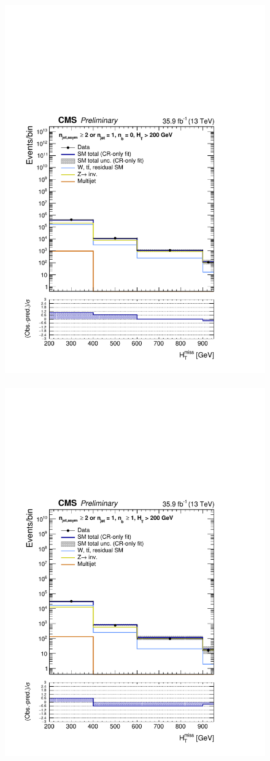 \begin{figure}[h!]
  \centering
  \caption{}
  \includegraphics[width=0.8\linewidth]{figures/results/36invfb/aggregated/postFitShapeCR/mhtShape_eq0b_ge1j2a_200_Inf_crfit.pdf} ~
  \includegraphics[width=0.8\linewidth]{figures/results/36invfb/aggregated/postFitShapeCR/mhtShape_ge1b_ge1j2a_200_Inf_crfit.pdf} ~

\end{figure}
